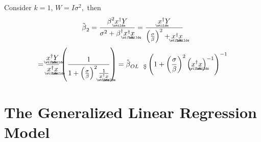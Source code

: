\documentclass{article}
\begin{document}
Consider $k=1$, $W=I\sigma ^{2},$ then%
\begin{equation*}
\tilde{\beta}_{2}=\frac{\beta ^{2}%
\underaccent{\wtilde}{x}%
^{\dagger }Y}{\sigma ^{2}+\beta ^{\dagger }%
\underaccent{\wtilde}{x}%
^{\dagger }%
\underaccent{\wtilde}{x}%
}=\frac{%
\underaccent{\wtilde}{x}%
^{\dagger }Y}{\left( \frac{\sigma }{\beta }\right) ^{2}+%
\underaccent{\wtilde}{x}%
^{\dagger }%
\underaccent{\wtilde}{x}%
}
\end{equation*}%
\begin{equation*}
=\frac{%
\underaccent{\wtilde}{x}%
^{\dagger }%
\underaccent{\wtilde}{Y}%
}{%
\underaccent{\wtilde}{x}%
^{\dagger }%
\underaccent{\wtilde}{x}%
}\left( \frac{1}{1+\left( \frac{\sigma }{\beta }\right) ^{2}\frac{1}{%
\underaccent{\wtilde}{x}%
^{\dagger }%
\underaccent{\wtilde}{x}%
}}\right) =\hat{\beta}_{OL\text{\c{S}}}\left( 1+\left( \frac{\sigma }{\beta }%
\right) ^{2}\left( 
\underaccent{\wtilde}{x}%
^{\dagger }%
\underaccent{\wtilde}{x}%
\right) ^{-1}\right) ^{-1}
\end{equation*}

\bigskip

\newpage 

\part{The Generalized Linear Regression Model}
\end{document}
